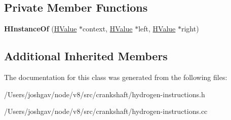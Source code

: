 \subsection*{Private Member Functions}
\begin{DoxyCompactItemize}
\item 
{\bfseries H\+Instance\+Of} (\hyperlink{classv8_1_1internal_1_1_h_value}{H\+Value} $\ast$context, \hyperlink{classv8_1_1internal_1_1_h_value}{H\+Value} $\ast$left, \hyperlink{classv8_1_1internal_1_1_h_value}{H\+Value} $\ast$right)\hypertarget{classv8_1_1internal_1_1_h_instance_of_a19b9d0846a325e42991f1d874f0c8586}{}\label{classv8_1_1internal_1_1_h_instance_of_a19b9d0846a325e42991f1d874f0c8586}

\end{DoxyCompactItemize}
\subsection*{Additional Inherited Members}


The documentation for this class was generated from the following files\+:\begin{DoxyCompactItemize}
\item 
/\+Users/joshgav/node/v8/src/crankshaft/hydrogen-\/instructions.\+h\item 
/\+Users/joshgav/node/v8/src/crankshaft/hydrogen-\/instructions.\+cc\end{DoxyCompactItemize}
